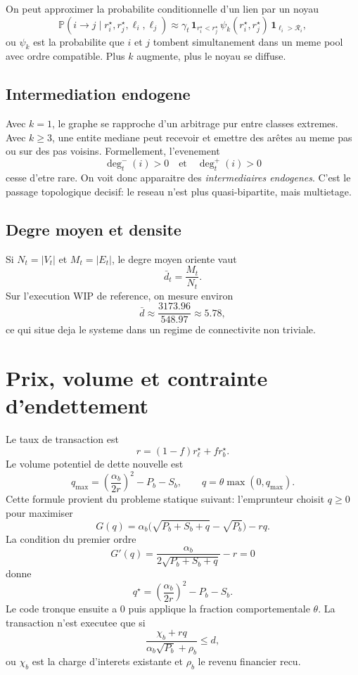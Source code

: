 \documentclass[11pt,a4paper]{article}
\begin{document}
On peut approximer la probabilite conditionnelle d'un lien par un noyau
\[
\mathbb P(i\to j \mid r_i^\star, r_j^\star, \ell_i,\ell_j)
\approx
\gamma_t\,
\mathbf 1_{r_i^\star<r_j^\star}\,
\psi_k(r_i^\star,r_j^\star)\,
\mathbf 1_{\ell_i>\mathcal R_i},
\]
ou $\psi_k$ est la probabilite que $i$ et $j$ tombent simultanement dans un meme pool avec ordre compatible. Plus $k$ augmente, plus le noyau se diffuse.

\subsection{Intermediation endogene}
Avec $k=1$, le graphe se rapproche d'un arbitrage pur entre classes extremes. Avec $k\ge 3$, une entite mediane peut recevoir et emettre des arêtes au meme pas ou sur des pas voisins. Formellement, l'evenement
\[
\deg_t^-(i)>0 \quad \text{et} \quad \deg_t^+(i)>0
\]
cesse d'etre rare. On voit donc apparaitre des \emph{intermediaires endogenes}. C'est le passage topologique decisif: le reseau n'est plus quasi-bipartite, mais multietage.

\subsection{Degre moyen et densite}
Si $N_t=|V_t|$ et $M_t=|E_t|$, le degre moyen oriente vaut
\[
\bar d_t = \frac{M_t}{N_t}.
\]
Sur l'execution WIP de reference, on mesure environ
\[
\bar d \approx \frac{3173.96}{548.97}\approx 5.78,
\]
ce qui situe deja le systeme dans un regime de connectivite non triviale.

\section{Prix, volume et contrainte d'endettement}
Le taux de transaction est
\[
r = (1-f)r^\star_{\ell}+fr^\star_b.
\]
Le volume potentiel de dette nouvelle est
\[
q_{\max} = \left(\frac{\alpha_b}{2r}\right)^2 - P_b - S_b,
\qquad
q=\theta\max(0,q_{\max}).
\]
Cette formule provient du probleme statique suivant: l'emprunteur choisit $q\ge 0$ pour maximiser
\[
G(q)=\alpha_b\big(\sqrt{P_b+S_b+q}-\sqrt{P_b}\big)-rq.
\]
La condition du premier ordre
\[
G'(q)=\frac{\alpha_b}{2\sqrt{P_b+S_b+q}}-r=0
\]
donne
\[
q^\star = \left(\frac{\alpha_b}{2r}\right)^2 - P_b - S_b.
\]
Le code tronque ensuite a $0$ puis applique la fraction comportementale $\theta$.
La transaction n'est executee que si
\[
\frac{\chi_b + rq}{\alpha_b\sqrt{P_b}+\rho_b}\le d,
\]
ou $\chi_b$ est la charge d'interets existante et $\rho_b$ le revenu financier recu.
\end{document}
